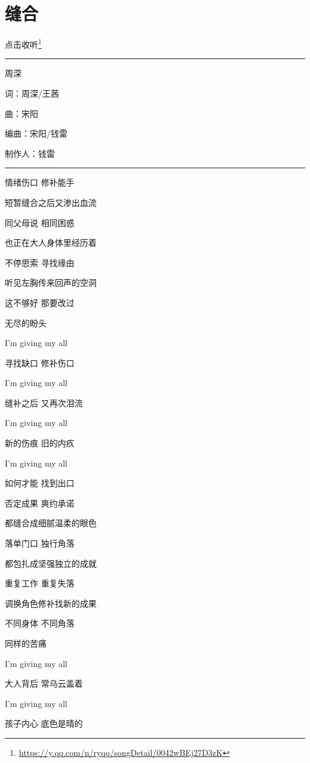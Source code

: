 \documentclass[]{ctexbook}
\renewcommand{\href}[2]{#2\footnote{\url{#1}}}
\begin{document}
\section*{缝合}\label{fix-you}


\href{https://y.qq.com/n/ryqq/songDetail/0042wBEj27D3zK}{点击收听}

\begin{center}\rule{0.5\linewidth}{0.5pt}\end{center}

周深

词：周深/王茜

曲：宋阳

编曲：宋阳/钱雷

制作人：钱雷

\begin{center}\rule{0.5\linewidth}{0.5pt}\end{center}

情绪伤口 修补能手

短暂缝合之后又渗出血流

同父母说 相同困惑

也正在大人身体里经历着

不停思索 寻找缘由

听见左胸传来回声的空洞

这不够好 那要改过

无尽的盼头

I'm giving my all

寻找缺口 修补伤口

I'm giving my all

缝补之后 又再次泪流

I'm giving my all

新的伤痕 旧的内疚

I'm giving my all

如何才能 找到出口

否定成果 爽约承诺

都缝合成细腻温柔的眼色

落单门口 独行角落

都包扎成坚强独立的成就

重复工作 重复失落

调换角色修补找新的成果

不同身体 不同角落

同样的苦痛

I'm giving my all

大人背后 常乌云盖着

I'm giving my all

孩子内心 底色是晴的
\end{document}
